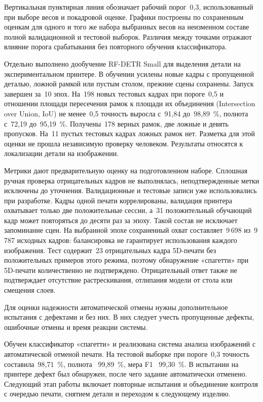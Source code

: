 Вертикальная пунктирная линия обозначает рабочий порог~0,3, использованный при выборе весов и покадровой оценке. Графики построены по сохраненным оценкам для одного и того же набора выбранных весов на неизменном составе полной валидационной и тестовой выборок. Различия между точками отражают влияние порога срабатывания без повторного обучения классификатора.

Отдельно выполнено дообучение RF-DETR Small для выделения детали на экспериментальном принтере. В обучении усилены новые кадры с пропущенной деталью, ложной рамкой или пустым столом, прежние сцены сохранены. Запуск завершен за~10 эпох. На~198 новых тестовых кадрах при пороге~0,5 и отношении площади пересечения рамок к площади их объединения (Intersection over Union, IoU) не менее~0,5 точность выросла с~91,84 до~98,89~\%, полнота~\textemdash{} с~72,19 до~95,19~\%. Получены~178 верных рамок, две ложные и девять пропусков. На~11 пустых тестовых кадрах ложных рамок нет. Разметка для этой оценки не прошла независимую проверку человеком. Результаты относятся к локализации детали на изображении.

Метрики дают предварительную оценку на подготовленном наборе. Сплошная ручная проверка отрицательных кадров не выполнялась, неподтвержденные метки исключены до уточнения. Валидационные и тестовые записи уже использовались при разработке. Кадры одной печати коррелированы, валидация принтера охватывает только две положительные сессии, а~31 положительный обучающий кадр может повторяться до десяти раз за эпоху. Такой состав не исключает запоминание сцен. На выбранной эпохе сохраненный охват составляет~9\,698 из~9\,787 исходных кадров: балансировка не гарантирует использования каждого изображения. Тест содержит~23 отрицательных кадра 5D-печати без положительных примеров этого режима, поэтому обнаружение «спагетти» при 5D-печати количественно не подтверждено. Отрицательный ответ также не подтверждает отсутствие растрескивания, отлипания модели от стола или смещения слоев.

Для оценки надежности автоматической отмены нужны дополнительное испытания с дефектами и без них. В них следует учесть пропущенные дефекты, ошибочные отмены и время реакции системы.

Обучен классификатор «спагетти» и реализована система анализа изображений с автоматической отменой печати. На тестовой выборке при пороге~0,3 точность составила~98,71~\%, полнота~\textemdash{} 99,89~\%, мера F1~\textemdash{} 99,30~\%. В испытании на принтере дефект был обнаружен, после чего задание автоматически отменено. Следующий этап работы включает повторные испытания и объединение контроля с очередью печати, снятием детали и переходом к следующему изделию.
